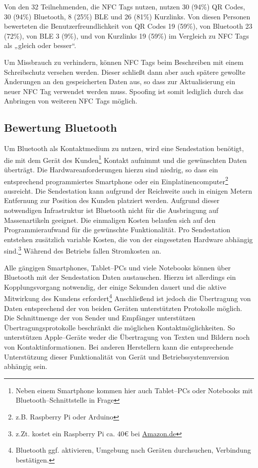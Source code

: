 Von den 32 Teilnehmenden, die NFC Tags nutzen, nutzen 30 (94\%) QR Codes, 30 (94\%) Bluetooth, 8 (25\%) \ac{BLE} und 26 (81\%) Kurzlinks. Von diesen Personen bewerteten die  Benutzerfreundlichkeit von QR Codes 19 (59\%), von Bluetooth 23 (72\%), von \ac{BLE} 3 (9\%), und von Kurzlinks 19 (59\%) im Vergleich zu NFC Tags als „gleich oder besser“.

Um Missbrauch zu verhindern, können NFC Tags beim Beschreiben mit einem Schreibschutz versehen werden. Dieser schließt dann aber auch spätere gewollte Änderungen an den gespeicherten Daten aus, so dass zur Aktualisierung ein neuer NFC Tag verwendet werden muss. Spoofing ist somit lediglich durch das Anbringen von weiteren NFC Tags möglich.

\subsection{Bewertung Bluetooth} %
\label{sub:bewertung_bluetooth}
Um Bluetooth als Kontaktmedium zu nutzen, wird eine Sendestation benötigt, die mit dem Gerät des Kunden\footnote{Neben einem Smartphone kommen hier auch Tablet–PCs oder Notebooks mit Bluetooth–Schnittstelle in Frage} Kontakt aufnimmt und die gewünschten Daten überträgt. Die Hardwareanforderungen hierzu sind niedrig, so dass ein entsprechend programmiertes Smartphone oder ein Einplatinencomputer\footnote{z.B. Raspberry Pi oder Arduino} ausreicht. Die Sendestation kann aufgrund der Reichweite auch in einigen Metern Entfernung zur Position des Kunden platziert werden. Aufgrund dieser notwendigen Infrastruktur ist Bluetooth nicht für die Ausbringung auf Massenartikeln geeignet. Die einmaligen Kosten belaufen sich auf den Programmieraufwand für die gewünschte Funktionalität. Pro Sendestation entstehen zusätzlich variable Kosten, die von der eingesetzten Hardware abhängig sind.\footnote{z.Zt. kostet ein Raspberry Pi ca. 40€ bei \url{Amazon.de}} Während des Betriebs fallen Stromkosten an.

Alle gängigen Smartphones, Tablet–PCs und viele Notebooks können über Bluetooth mit der Sendestation Daten austauschen. Hierzu ist allerdings ein Kopplungsvorgang notwendig, der einige Sekunden dauert und die aktive Mitwirkung des Kundens erfordert\footnote{Bluetooth ggf. aktivieren, Umgebung nach Geräten durchsuchen, Verbindung bestätigen.} Anschließend ist jedoch die Übertragung von Daten entsprechend der von beiden Geräten unterstützten Protokolle möglich. Die Schnittmenge der von Sender und Empfänger unterstützen Übertragungsprotokolle beschränkt die möglichen Kontaktmöglichkeiten. So unterstützen Apple–Geräte weder die Übertragung von Texten und Bildern noch von Kontaktinformationen. Bei anderen Herstellern kann die entsprechende Unterstützung dieser Funktionalität von Gerät und Betriebssystemversion abhängig sein.

